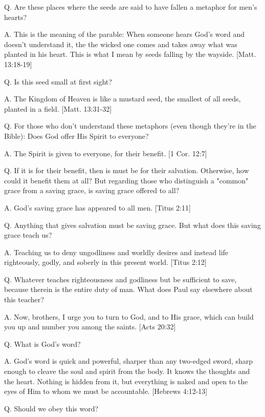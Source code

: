 \documentclass[../main.tex]{subfiles}
\begin{document}
	Q. Are these places where the seeds are said to have fallen a metaphor for men's hearts?

	A. This is the meaning of the parable: When someone hears God's word and doesn't understand it, the the wicked one comes and takes away what was planted in his heart. This is what I mean by seeds falling by the wayside. [Matt. 13:18-19]

	Q. Is this seed small at first sight?

	A. The Kingdom of Heaven is like a mustard seed, the smallest of all seeds, planted in a field. [Matt. 13:31-32]

	Q. For those who don't understand these metaphors (even though they're in the Bible): Does God offer His Spirit to everyone?

	A. The Spirit is given to everyone, for their benefit. [1 Cor. 12:7]

	Q. If it is for their benefit, then is must be for their salvation. Otherwise, how could it benefit them at all? But regarding those who distinguish a "common" grace from a saving grace, is saving grace offered to all?

	A. God's saving grace has appeared to all men. [Titus 2:11]

	Q. Anything that gives salvation must be saving grace. But what does this saving grace teach us?

	A. Teaching us to deny ungodliness and worldly desires and instead life righteously, godly, and soberly in this present world. [Titus 2:12]

	Q. Whatever teaches righteousness and godliness but be sufficient to save, because therein is the entire duty of man.  What does Paul say elsewhere about this teacher?

	A. Now, brothers, I urge you to turn to God, and to His grace, which can build you up and number you among the saints. [Acts 20:32]

	Q. What is God's word?

	A. God's word is quick and powerful, sharper than any two-edged sword, sharp enough to cleave the soul and spirit from the body. It knows the thoughts and the heart. Nothing is hidden from it, but everything is naked and open to the eyes of Him to whom we must be accountable. [Hebrews 4:12-13]

	Q. Should we obey this word?
\end{document}
